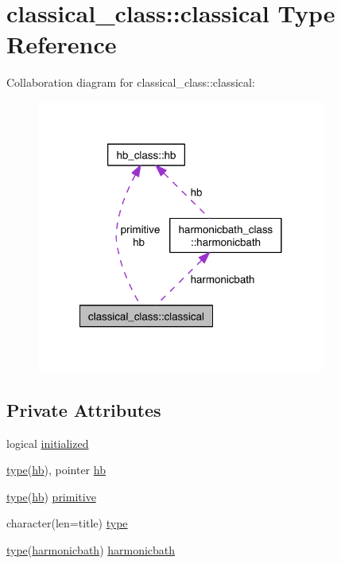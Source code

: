 \hypertarget{structclassical__class_1_1classical}{}\section{classical\+\_\+class\+:\+:classical Type Reference}
\label{structclassical__class_1_1classical}


Collaboration diagram for classical\+\_\+class\+:\+:classical\+:\nopagebreak
\begin{figure}[H]
\begin{center}
\leavevmode
\includegraphics[width=269pt]{structclassical__class_1_1classical__coll__graph}
\end{center}
\end{figure}
\subsection*{Private Attributes}
\begin{DoxyCompactItemize}
\item 
logical \hyperlink{structclassical__class_1_1classical_a5f61e82b2e7ad767b39cea9512cd1e79}{initialized}
\item 
\hyperlink{structclassical__class_1_1classical_a4c835c43f9359c512790ebce83387d63}{type}(\hyperlink{structhb__class_1_1hb}{hb}), pointer \hyperlink{structclassical__class_1_1classical_a1b460aa0f46813107d5d6b2c6904b714}{hb}
\item 
\hyperlink{structclassical__class_1_1classical_a4c835c43f9359c512790ebce83387d63}{type}(\hyperlink{structhb__class_1_1hb}{hb}) \hyperlink{structclassical__class_1_1classical_ae02517eaafa051141de41d949d7be0ef}{primitive}
\item 
character(len=title) \hyperlink{structclassical__class_1_1classical_a4c835c43f9359c512790ebce83387d63}{type}
\item 
\hyperlink{structclassical__class_1_1classical_a4c835c43f9359c512790ebce83387d63}{type}(\hyperlink{structharmonicbath__class_1_1harmonicbath}{harmonicbath}) \hyperlink{structclassical__class_1_1classical_a36ea44d91c4d0b5dd920ba9099be4ceb}{harmonicbath}
\end{DoxyCompactItemize}



